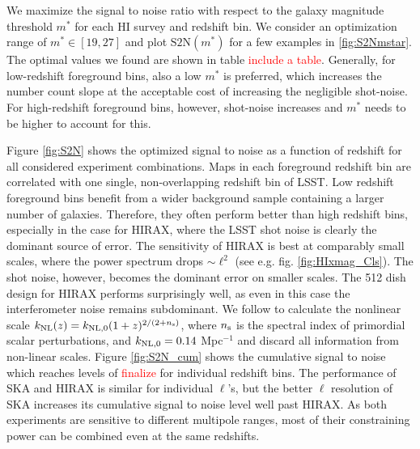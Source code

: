 \documentclass[useAMS,usenatbib]{mnras}
\newcommand{\ama}[1]{\textcolor{red}{{#1}}}
\begin{document}
We maximize the signal to noise ratio with respect to the galaxy magnitude threshold $m^*$ for each HI survey and redshift bin. We consider an optimization range of $m^* \in [19,27]$ and plot $\mathrm{S2N}(m^*)$ for a few examples in \ref{fig:S2Nmstar}. The optimal values we found are shown in table \ama{include a table}. Generally, for low-redshift foreground bins, also a low $m^*$ is preferred, which increases the number count slope at the acceptable cost of increasing the negligible shot-noise. For high-redshift foreground bins, however, shot-noise increases and $m^*$ needs to be higher to account for this.

Figure \ref{fig:S2N} shows the optimized signal to noise as a function of redshift for all considered experiment combinations. Maps in each foreground redshift bin are correlated with one single, non-overlapping redshift bin of LSST. Low redshift foreground bins benefit from a wider background sample containing a larger number of galaxies. Therefore, they often perform better than high redshift bins, especially in the case for HIRAX, where the LSST shot noise is clearly the dominant source of error. The sensitivity of HIRAX is best at comparably small scales, where the power spectrum drops $\sim \ell^2$ (see e.g. fig. \ref{fig:HIxmag_Cls}). The shot noise, however, becomes the dominant error on smaller scales. The 512 dish design for HIRAX performs surprisingly well, as even in this case the interferometer noise remains subdominant. We follow \cite{Smith:2002dz} to calculate the nonlinear scale $k_{\rm NL}(z) = k_{\rm NL,0} (1+z)^{2/(2+n_{\rm s})}$, where $n_{\rm s}$ is the spectral index of primordial scalar perturbations, and $k_{\rm NL,0} = 0.14$ Mpc${}^{-1}$ and discard all information from non-linear scales. Figure \ref{fig:S2N_cum} shows the cumulative signal to noise which reaches levels of \ama{finalize} for individual redshift bins. The performance of SKA and HIRAX is similar for individual $\ell$'s, but the better $\ell$ resolution of SKA increases its cumulative signal to noise level well past HIRAX. As both experiments are sensitive to different multipole ranges, most of their constraining power can be combined even at the same redshifts.
\end{document}
